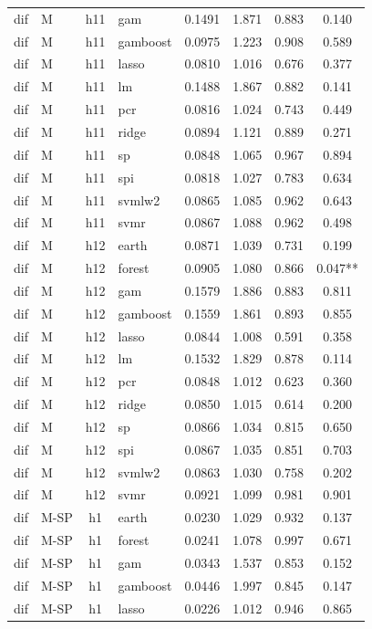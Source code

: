 \begin{ThreePartTable}
\begin{longtable}[t]{llclcccc}
dif & M & h11 & gam & 0.1491 & 1.871 & 0.883 & 0.140\\
dif & M & h11 & gamboost & 0.0975 & 1.223 & 0.908 & 0.589\\
dif & M & h11 & lasso & 0.0810 & 1.016 & 0.676 & 0.377\\
dif & M & h11 & lm & 0.1488 & 1.867 & 0.882 & 0.141\\
dif & M & h11 & pcr & 0.0816 & 1.024 & 0.743 & 0.449\\
dif & M & h11 & ridge & 0.0894 & 1.121 & 0.889 & 0.271\\
dif & M & h11 & sp & 0.0848 & 1.065 & 0.967 & 0.894\\
dif & M & h11 & spi & 0.0818 & 1.027 & 0.783 & 0.634\\
dif & M & h11 & svmlw2 & 0.0865 & 1.085 & 0.962 & 0.643\\
dif & M & h11 & svmr & 0.0867 & 1.088 & 0.962 & 0.498\\
\addlinespace
dif & M & h12 & earth & 0.0871 & 1.039 & 0.731 & 0.199\\
dif & M & h12 & forest & 0.0905 & 1.080 & 0.866 & 0.047**\\
dif & M & h12 & gam & 0.1579 & 1.886 & 0.883 & 0.811\\
dif & M & h12 & gamboost & 0.1559 & 1.861 & 0.893 & 0.855\\
dif & M & h12 & lasso & 0.0844 & 1.008 & 0.591 & 0.358\\
dif & M & h12 & lm & 0.1532 & 1.829 & 0.878 & 0.114\\
dif & M & h12 & pcr & 0.0848 & 1.012 & 0.623 & 0.360\\
dif & M & h12 & ridge & 0.0850 & 1.015 & 0.614 & 0.200\\
dif & M & h12 & sp & 0.0866 & 1.034 & 0.815 & 0.650\\
dif & M & h12 & spi & 0.0867 & 1.035 & 0.851 & 0.703\\
dif & M & h12 & svmlw2 & 0.0863 & 1.030 & 0.758 & 0.202\\
dif & M & h12 & svmr & 0.0921 & 1.099 & 0.981 & 0.901\\
\addlinespace
dif & M-SP & h1 & earth & 0.0230 & 1.029 & 0.932 & 0.137\\
dif & M-SP & h1 & forest & 0.0241 & 1.078 & 0.997 & 0.671\\
dif & M-SP & h1 & gam & 0.0343 & 1.537 & 0.853 & 0.152\\
dif & M-SP & h1 & gamboost & 0.0446 & 1.997 & 0.845 & 0.147\\
dif & M-SP & h1 & lasso & 0.0226 & 1.012 & 0.946 & 0.865\\

\end{longtable}
\end{ThreePartTable}
